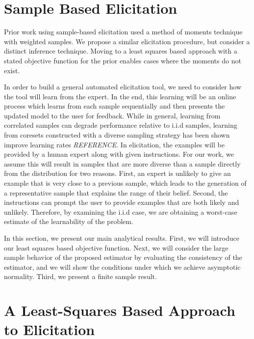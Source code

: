 \section{Sample Based Elicitation}

Prior work using sample-based elicitation used a method of moments technique with weighted samples. We propose a similar elicitation procedure, but consider a distinct inference technique. Moving to a least squares based approach with a stated objective function for the prior enables cases where the moments do not exist. 

In order to build a general automated elicitation tool, we need to consider how the tool will learn from the expert. In the end, this learning will be an online process which learns from each sample sequentially and then presents the updated model to the user for feedback. 
While in general, learning from correlated samples can degrade performance relative to i.i.d samples, learning from coresets constructed with a diverse sampling strategy has been shown improve learning rates \textit{REFERENCE}. In elicitation, the examples will be provided by a human expert along with given instructions. For our work, we assume this will result in samples that are more diverse than a sample directly from the distribution for two reasons. First, an expert is unlikely to give an example that is very close to a previous sample, which leads to the generation of a representative sample that explains the range of their belief. Second, the instructions can prompt the user to provide examples that are both likely and unlikely. Therefore, by examining the i.i.d case, we are obtaining a worst-case estimate of the learnability of the problem. 

In this section, we present our main analytical results. 
First, we will introduce our least squares based objective function. 
Next, we will consider the large sample behavior of the proposed estimator 
by evaluating the consistency of the estimator, and we will show the conditions under which we achieve asymptotic normality. Third, we present a finite sample result. 

\section*{A Least-Squares Based Approach to Elicitation}


